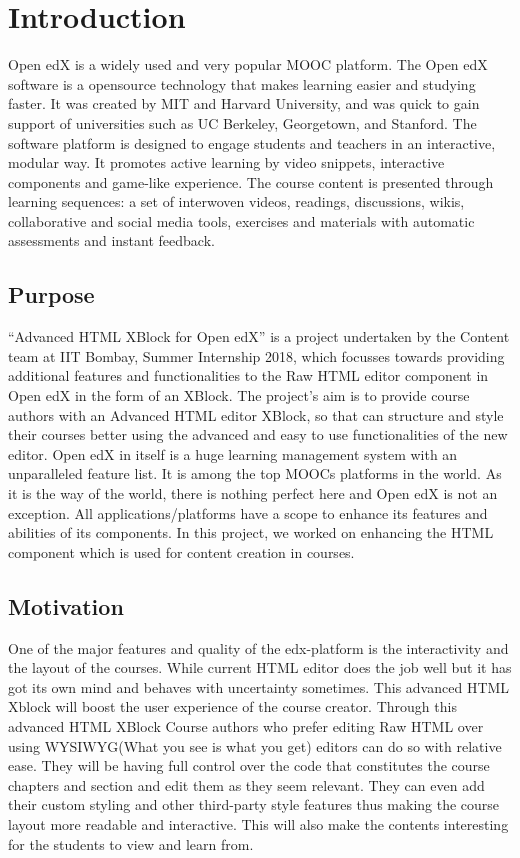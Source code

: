 \chapter{Introduction}

Open edX is a widely used and very popular MOOC platform. The Open edX software is a opensource
technology that makes learning easier and studying faster. It was created by MIT and
Harvard University, and was quick to gain support of universities such as UC Berkeley, Georgetown,
and Stanford.\newline
The software platform is designed to engage students and teachers in an interactive, modular way. It
promotes active learning by video snippets, interactive components and game-like experience. The
course content is presented through learning sequences: a set of interwoven videos, readings,
discussions, wikis, collaborative and social media tools, exercises and materials with automatic
assessments and instant feedback.\newline


\section{Purpose}
“Advanced HTML XBlock for Open edX” is a project undertaken by the Content team at IIT
Bombay, Summer Internship 2018, which focusses towards providing additional features and
functionalities to the Raw HTML editor component in Open edX in the form of an XBlock. The
project’s aim is to provide course authors with an Advanced HTML editor XBlock, so that can
structure and style their courses better using the advanced and easy to use functionalities of the new
editor. Open edX in itself is a huge learning management system with an unparalleled feature
list. It is among the top MOOCs platforms in the world. As it is the way of the world, there is
nothing perfect here and Open edX is not an exception. All applications/platforms have a scope to
enhance its features and abilities of its components. In this project, we worked on enhancing the
HTML component which is used for content creation in courses.

\section{Motivation}
One of the major features and quality of the edx-platform is the interactivity and the layout of the
courses. While current HTML editor does the job well but it has got its own mind and behaves with
uncertainty sometimes. This advanced HTML Xblock will boost the user experience of the course
creator. Through this advanced HTML XBlock Course authors who prefer editing Raw HTML over
using WYSIWYG(What you see is what you get) editors can do so with relative ease. They will be having full control over the
code that constitutes the course chapters and section and edit them as they seem relevant. They can
even add their custom styling and other third-party style features thus making the course layout
more readable and interactive. This will also make the contents interesting for the students to view
and learn from.

